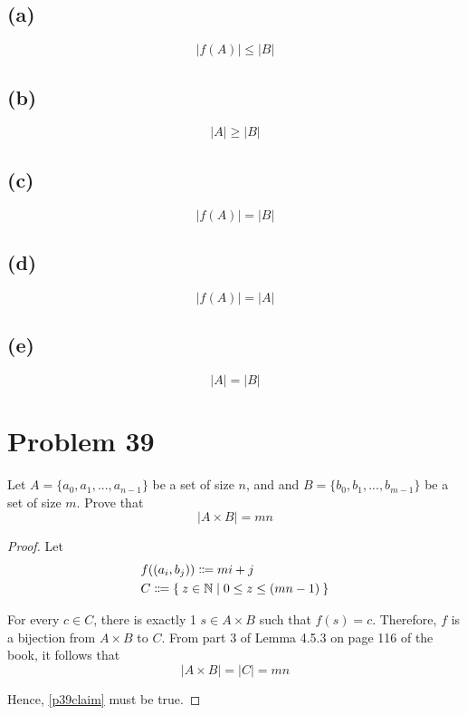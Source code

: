 \documentclass{article}
\begin{document}
\subsection{(a)}
\[
	|f(A)| \le |B|
\]

\subsection{(b)}
\[
	|A| \ge |B|
\]

\subsection{(c)}
\[
	|f(A)| = |B|
\]

\subsection{(d)}
\[
	|f(A)| = |A|
\]

\subsection{(e)}
\[
	|A| = |B|
\]

\pagebreak

\section{Problem 39}
Let $A = \{a_0, a_1, ..., a_{n-1}\}$ be a set of size $n$, and and $B = \{b_0,b_1,...,b_{m-1}\}$ be a set of size $m$. Prove that
\begin{equation}\label{p39claim}
	|A \times B| = mn
\end{equation}
\begin{proof}
	Let
	\begin{align*}
		 & f((a_i, b_j)) \Coloneqq mi + j                            \\
		 & C \Coloneqq \Set{z \in \mathbb{N} | 0 \le z \le (mn - 1)}
	\end{align*}

	For every $c \in C$, there is exactly 1 $s \in A \times B$ such that $f(s) = c$. Therefore, $f$ is a bijection from $A \times B$ to $C$. From part 3 of Lemma 4.5.3 on page 116 of the book, it follows that
	\[
		|A \times B| = |C| = mn
	\]

	Hence, \eqref{p39claim} must be true.
\end{proof}

\pagebreak
\end{document}

